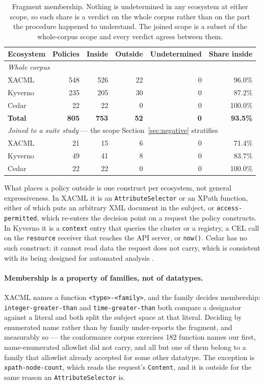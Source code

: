 \documentclass[11pt,a4paper]{article}
\theoremstyle{plain}
\theoremstyle{definition}
\theoremstyle{remark}
\begin{document}
\begin{table}[t]
\centering
\begin{tabular}{lrrrrr}
\toprule
Ecosystem & Policies & Inside & Outside & Undetermined & Share inside \\
\midrule
\multicolumn{6}{l}{\emph{Whole corpus}} \\
XACML \cite{xacml30} & 548 & 526 & 22 & 0 & 96.0\% \\
Kyverno \cite{kyverno} & 235 & 205 & 30 & 0 & 87.2\% \\
Cedar \cite{cedar2024} & 22 & 22 & 0 & 0 & 100.0\% \\
\midrule
\textbf{Total} & \textbf{805} & \textbf{753} & \textbf{52} & \textbf{0} & \textbf{93.5\%} \\
\midrule
\multicolumn{6}{l}{\emph{Joined to a suite study} --- the scope Section~\ref{sec:negative} stratifies} \\
XACML & 21 & 15 & 6 & 0 & 71.4\% \\
Kyverno & 49 & 41 & 8 & 0 & 83.7\% \\
Cedar & 22 & 22 & 0 & 0 & 100.0\% \\
\bottomrule
\end{tabular}
\caption{Fragment membership. Nothing is undetermined in any ecosystem at either scope, so
each share is a verdict on the whole corpus rather than on the part the procedure happened
to understand. The joined scope is a subset of the whole-corpus scope and every verdict
agrees between them.}
\label{tab:membership}
\end{table}

What places a policy outside is one construct per ecosystem, not general expressiveness. In
XACML it is an \texttt{AttributeSelector} or an XPath function, either of which puts an
arbitrary XML document in the subject, or \texttt{access-permitted}, which re-enters the
decision point on a request the policy constructs. In Kyverno it is a \texttt{context} entry
that queries the cluster or a registry, a CEL call on the \texttt{resource} receiver that
reaches the API server, or \texttt{now()}. Cedar has no such construct: it cannot read data
the request does not carry, which is consistent with its being designed for automated
analysis \cite{cedar2024}.

\paragraph{Membership is a property of families, not of datatypes.} XACML names a function
\texttt{<type>-<family>}, and the family decides membership: \texttt{integer-greater-than}
and \texttt{time-greater-than} both compare a designator against a literal and both split
the subject space at that literal. Deciding by enumerated name rather than by family
under-reports the fragment, and measurably so --- the conformance corpus exercises 182
function names our first, name-enumerated allowlist did not carry, and all but one of them
belong to a family that allowlist already accepted for some other datatype. The exception is
\texttt{xpath-node-count}, which reads the request's \texttt{Content}, and it is outside for
the same reason an \texttt{AttributeSelector} is.
\end{document}
